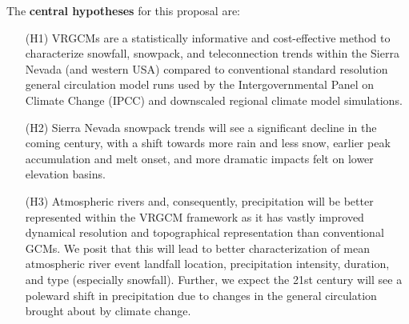 \documentclass[11pt]{article}
\begin{document}
\noindent The \textbf{central hypotheses} for this proposal are:

\vspace{-0.4cm}
\begin{itemize}
\item[(H1)] VRGCMs are a statistically informative and cost-effective method to characterize snowfall, snowpack, and teleconnection trends within the Sierra Nevada (and western USA) compared to conventional standard resolution general circulation model runs used by the Intergovernmental Panel on Climate Change (IPCC) and downscaled regional climate model simulations.
\item[(H2)] Sierra Nevada snowpack trends will see a significant decline in the coming century, with a shift towards more rain and less snow, earlier peak accumulation and melt onset, and more dramatic impacts felt on lower elevation basins.
\item[(H3)] Atmospheric rivers and, consequently, precipitation will be better represented within the VRGCM framework as it has vastly improved dynamical resolution and topographical representation than conventional GCMs.  We posit that this will lead to better characterization of mean atmospheric river event landfall location, precipitation intensity, duration, and type (especially snowfall).  Further, we expect the 21st century will see a poleward shift in precipitation due to changes in the general circulation brought about by climate change.  
\end{itemize}
\end{document}
